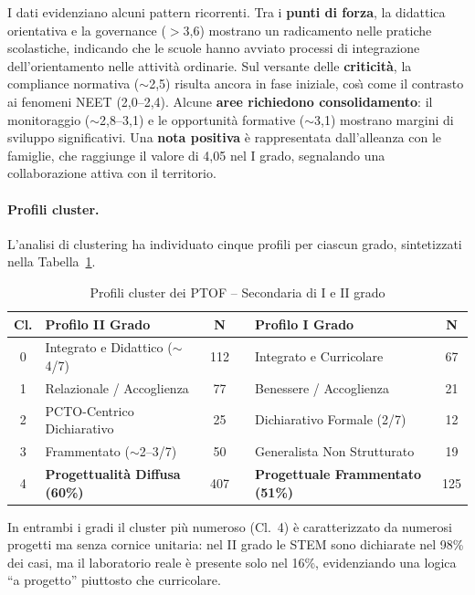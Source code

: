 \documentclass[12pt,a4paper]{article}
\begin{document}
I dati evidenziano alcuni pattern ricorrenti. Tra i \textbf{punti di forza}, la didattica orientativa e la governance ($>$3,6) mostrano un radicamento nelle pratiche scolastiche, indicando che le scuole hanno avviato processi di integrazione dell'orientamento nelle attivit\`a ordinarie. Sul versante delle \textbf{criticit\`a}, la compliance normativa ($\sim$2,5) risulta ancora in fase iniziale, cos\`\i{} come il contrasto ai fenomeni NEET (2,0--2,4). Alcune \textbf{aree richiedono consolidamento}: il monitoraggio ($\sim$2,8--3,1) e le opportunit\`a formative ($\sim$3,1) mostrano margini di sviluppo significativi. Una \textbf{nota positiva} \`e rappresentata dall'alleanza con le famiglie, che raggiunge il valore di 4,05 nel I grado, segnalando una collaborazione attiva con il territorio.

\paragraph{Profili cluster.}
L'analisi di clustering ha individuato cinque profili per ciascun grado, sintetizzati nella Tabella~\ref{tab:cluster}.

\begin{table}[h]
\centering
\caption{Profili cluster dei PTOF -- Secondaria di I e II grado}
\label{tab:cluster}
\small
\begin{tabularx}{\textwidth}{clcclc}
\toprule
\textbf{Cl.} & \textbf{Profilo II Grado} & \textbf{N} & & \textbf{Profilo I Grado} & \textbf{N} \\
\midrule
0 & Integrato e Didattico ($\sim$4/7) & 112 & & Integrato e Curricolare & 67 \\
1 & Relazionale / Accoglienza & 77 & & Benessere / Accoglienza & 21 \\
2 & PCTO-Centrico Dichiarativo & 25 & & Dichiarativo Formale (2/7) & 12 \\
3 & Frammentato ($\sim$2--3/7) & 50 & & Generalista Non Strutturato & 19 \\
4 & \textbf{Progettualit\`a Diffusa (60\%)} & 407 & & \textbf{Progettuale Frammentato (51\%)} & 125 \\
\bottomrule
\end{tabularx}
\end{table}

In entrambi i gradi il cluster pi\`u numeroso (Cl.~4) \`e caratterizzato da numerosi progetti ma senza cornice unitaria: nel II grado le STEM sono dichiarate nel 98\% dei casi, ma il laboratorio reale \`e presente solo nel 16\%, evidenziando una logica ``a progetto'' piuttosto che curricolare.
\end{document}
